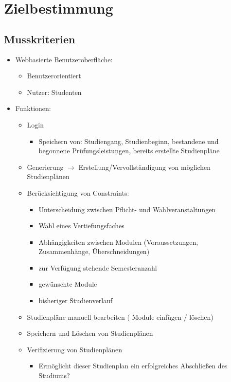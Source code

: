 \section{Zielbestimmung}

\subsection{Musskriterien}
\begin{itemize}[nosep]
	\item Webbasierte Benutzeroberfläche:
	\begin{itemize}[nosep]
		\item Benutzerorientiert 
		\item Nutzer: Studenten
	\end{itemize}
	\item Funktionen:
	\begin{itemize}[nosep]
		\item Login
			\begin{itemize}[nosep]
					\item Speichern von: Studiengang, Studienbeginn, bestandene und begonnene Prüfungsleistungen, bereits erstellte Studienpläne
				\end{itemize}
		\item Generierung $\rightarrow$ Erstellung/Vervollständigung von möglichen Studienplänen
		\item Berücksichtigung von Constraints:
		\begin{itemize}[nosep]
			\item Unterscheidung zwischen Pflicht- und Wahlveranstaltungen
			\item Wahl eines Vertiefungsfaches
			\item Abhängigkeiten zwischen Modulen (Voraussetzungen, Zusammenhänge, Überschneidungen)
			\item zur Verfügung stehende Semesteranzahl
			\item gewünschte Module
			\item bisheriger Studienverlauf
		\end{itemize}
		\item Studienpläne manuell bearbeiten ( Module einfügen / löschen)
		\item Speichern und Löschen von Studienplänen
		\item Verifizierung von Studienplänen
		\begin{itemize}[nosep]
			\item Ermöglicht dieser Studienplan ein erfolgreiches Abschließen des Studiums?

\end{itemize}
\end{itemize}
\end{itemize}
